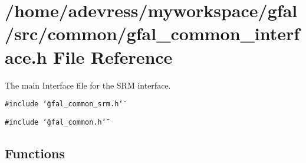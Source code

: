 \section{/home/adevress/myworkspace/gfal/src/common/gfal\_\-common\_\-interface.h File Reference}
\label{gfal__common__interface_8h}
The main Interface file for the SRM interface. 

{\tt \#include \char`\"{}gfal\_\-common\_\-srm.h\char`\"{}}\par
{\tt \#include \char`\"{}gfal\_\-common.h\char`\"{}}\par
\subsection*{Functions}

